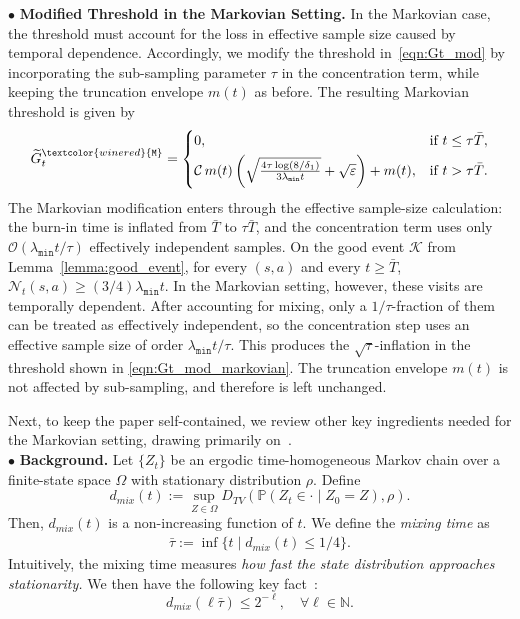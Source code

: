 \documentclass{article}
\newcommand{\mc}{\mathcal}
\begin{document}
\(\bullet\) \textbf{Modified Threshold in the Markovian Setting.} In the Markovian case, the threshold must account for the loss in effective sample size caused by temporal dependence. Accordingly, we modify the threshold in~\eqref{eqn:Gt_mod} by incorporating the sub-sampling parameter \(\tau\) in the concentration term, while keeping the truncation envelope \(m(t)\) as before. The resulting Markovian threshold  is given by
\begin{equation}\label{eqn:Gt_mod_markovian}
\widetilde{G}^{\textcolor{winered}{\texttt{M}}}_t =
\begin{cases}
0, & \text{if } t \leq \tau \bar{T}, \\[1mm]
\mc{C}\, m(t)
\left(
\sqrt{
\frac{4\tau\log(8/\delta_1)}
{3\lambda_{\texttt{min}} t}
}
+
\sqrt{\varepsilon}
\right)
+
m(t),
& \text{if } t > \tau \bar{T}.
\end{cases}
\end{equation} 
The Markovian modification enters through the effective sample-size calculation: the burn-in time is inflated from \(\bar T\) to \(\tau \bar T\), and the concentration term uses only \(\mc{O}(\lambda_{\texttt{min}}t/\tau)\) effectively independent samples. On the
good event \(\mc K\) from Lemma~\ref{lemma:good_event}, for every \((s,a)\) and every \(t\geq \bar T\),
\(\mc N_t(s,a)\geq (3/4)\lambda_{\texttt{min}}t.\) In the Markovian setting, however, these visits are temporally dependent. After accounting for mixing, only a \(1/\tau\)-fraction of them can be treated as effectively independent, so the concentration step uses an effective sample size of order \(\lambda_{\texttt{min}}t/\tau\). This produces the \(\sqrt{\tau}\)-inflation in the threshold shown in \eqref{eqn:Gt_mod_markovian}. The truncation envelope \(m(t)\) is not affected by sub-sampling, and therefore is left unchanged.

Next, to keep the paper self-contained, we review other key ingredients needed for the Markovian setting, drawing primarily on~\citet{dorfman}.\\
$\bullet$ \textbf{Background.} Let $\{Z_t\}$ be an ergodic time-homogeneous Markov chain over a finite-state space $\Omega$ with stationary distribution $\rho$. Define
\begin{equation}
    d_{mix}(t) := \sup_{Z \in \Omega} D_{TV}\left(\mathbb{P}(Z_{t} \in \cdot\mid Z_{0} =Z), \rho \right).
\end{equation}
Then, $d_{mix}(t)$ is a non-increasing function of $t$. We define the \textit{mixing time} as
\begin{equation}
\begin{aligned}
    \bar\tau := \inf \{t\mid d_{mix}(t) \leq 1/4\}.
\end{aligned}
\end{equation}
Intuitively, the mixing time measures \textit{how fast the state distribution approaches stationarity.} We then have the following key fact~\cite{dorfman}:
\begin{equation}
\boxed{d_{mix}(\ell\bar\tau)\leq 2^{-\ell},\quad\forall\ell\in \mathbb{N}.}\label{eqn:key_fact_mkv}
\end{equation}
\end{document}
